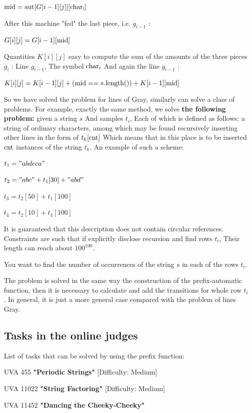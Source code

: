 ${\rm mid}={\rm aut}[G[i-1][j]][{\rm char_{i}}]$

After this machine "fed" the last piece, i.e. $g_ {i-1}$ :

$G [i][j] = G [i-1][{\rm mid}]$

Quantities $K [i][j]$ easy to compute the sum of the amounts of the three pieces $g_i$ : Line $g_ {i-1}$, The symbol ${\rm char} _i$ And again the line $g_ {i-1}$ :

$K[i][j]=K[i-1][j]+({\rm mid}==s.{\rm length()})+K[i-1][{\rm mid]}$

So we have solved the problem for lines of Gray, similarly can solve a class of problems. For example, exactly the same method, we solve \textbf{the following problem:} given a string $s$ And samples $t_i$, Each of which is defined as follows: a string of ordinary characters, among which may be found recursively inserting other lines in the form of $t_k [\rm cnt]$ Which means that in this place is to be inserted $\rm cnt$ instances of the string $t_k$. An example of such a scheme:

$t_1 =" abdeca" $

$t_2 =" abc" + t_1[30] + "abd" $

$t_3 = t_2 [50] + t_1 [100]$

$t_4 = t_2 [10] + t_3 [100]$

It is guaranteed that this description does not contain circular references. Constraints are such that if explicitly disclose recursion and find rows $t_i$, Their length can reach about $100 ^ {100}$.

You want to find the number of occurrences of the string $s$ in each of the rows $t_i$.

The problem is solved in the same way the construction of the prefix-automatic function, then it is necessary to calculate and add the transitions for whole row $ t_i $. In general, it is just a more general case compared with the problem of lines Gray.

\subsection{ Tasks in the online judges }

List of tasks that can be solved by using the prefix function:

UVA 455 \textbf{"Periodic Strings"} [Difficulty: Medium]

UVA 11022 \textbf{"String Factoring"} [Difficulty: Medium]

UVA 11452 \textbf{"Dancing the Cheeky-Cheeky"}

